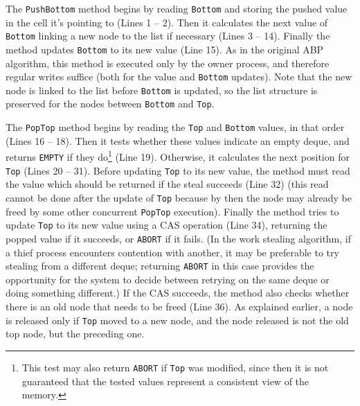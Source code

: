 
The \lstinline!PushBottom! method begins by reading \lstinline!Bottom!
and storing the pushed value in the cell it's pointing to (Lines
1 -- 2). Then it calculates the next value of \lstinline!Bottom! linking
a new node to the list if necessary (Lines 3 -- 14). Finally the method
updates \lstinline!Bottom! to its new value (Line 15). As in the
original ABP algorithm, this method is executed only by the owner
process, and therefore regular writes suffice (both for the value and
\lstinline!Bottom! updates). Note that the new node is linked to the
list before \lstinline!Bottom! is updated, so the list structure is
preserved for the nodes between \lstinline!Bottom! and
\lstinline!Top!.


The \lstinline!PopTop! method begins by reading the \lstinline!Top!
and \lstinline!Bottom! values, in that order (Lines 16 -- 18). Then it
tests whether these values indicate an empty deque, and returns
\lstinline!EMPTY! if they do\footnote{This test may also return
  \lstinline!ABORT! if \lstinline!Top! was modified, since then it is
  not guaranteed that the tested values represent a consistent view of
  the memory.} (Line 19). Otherwise, it calculates the next position
for \lstinline!Top! (Lines 20 -- 31). Before updating \lstinline!Top! to
its new value, the method must read the value which should be returned
if the steal succeeds (Line 32) (this read cannot be done after the
update of \lstinline!Top! because by then the node may already be
freed by some other concurrent \lstinline!PopTop! execution). Finally
the method tries to update \lstinline!Top! to its new value using a
CAS operation (Line 34), returning the popped value if it succeeds, or
\lstinline!ABORT! if it fails. (In the work stealing algorithm, if a
thief process encounters contention with another, it may be preferable
to try stealing from a different deque; returning \lstinline!ABORT! in
this case provides the opportunity for the system to decide between
retrying on the same deque or doing something different.) If the CAS
succeeds, the method also checks whether there is an old node that
needs to be freed (Line 36). As explained earlier, a node is released
only if \lstinline!Top! moved to a new node, and the node released is
not the old top node, but the preceding one.


